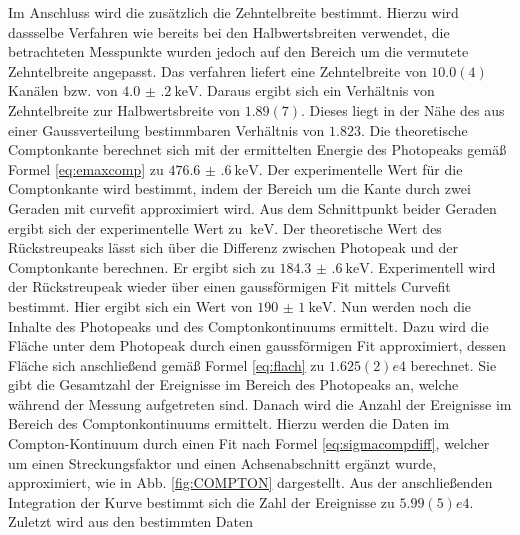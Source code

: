 Im Anschluss wird die zusätzlich die Zehntelbreite bestimmt. Hierzu wird dassselbe Verfahren wie bereits bei den Halbwertsbreiten verwendet, die betrachteten Messpunkte wurden jedoch auf den Bereich um die vermutete Zehntelbreite angepasst. Das verfahren liefert eine Zehntelbreite von $\si{10.0(4)}$ Kanälen bzw. von $\SI{4.0(2)}{\kilo\electronvolt}$. Daraus ergibt sich ein Verhältnis von Zehntelbreite zur Halbwertsbreite von $1.89(7)$. Dieses liegt in der Nähe des aus einer Gaussverteilung bestimmbaren Verhältnis von $\si{1.823}$\cite{V18}. Die theoretische Comptonkante berechnet sich mit der ermittelten Energie des Photopeaks gemäß Formel \eqref{eq:emaxcomp} zu $\SI{476.6(6)}{\kilo\electronvolt}$. Der experimentelle Wert für die Comptonkante wird bestimmt, indem der Bereich um die Kante durch zwei Geraden mit curvefit\cite{V18} approximiert wird. Aus dem Schnittpunkt beider Geraden ergibt sich der experimentelle Wert zu $\SI{}{\kilo\electronvolt}$. Der theoretische Wert des Rückstreupeaks lässt sich über die Differenz zwischen Photopeak und der Comptonkante berechnen. Er ergibt sich zu $\SI{184.3(6)}{\kilo\electronvolt}$. Experimentell wird der Rückstreupeak wieder über einen gaussförmigen Fit mittels Curvefit bestimmt. Hier ergibt sich ein Wert von $\SI{190(1)}{\kilo\electronvolt}$. Nun werden noch die Inhalte des Photopeaks und des Comptonkontinuums ermittelt. Dazu wird die Fläche unter dem Photopeak durch einen gaussförmigen Fit approximiert, dessen Fläche sich anschließend gemäß Formel \eqref{eq:flach} zu $\si{1.625(2)e4}$ berechnet. Sie gibt die Gesamtzahl der Ereignisse im Bereich des Photopeaks an, welche während der Messung aufgetreten sind. Danach wird die Anzahl der Ereignisse im Bereich des Comptonkontinuums ermittelt. Hierzu werden die Daten im Compton-Kontinuum durch einen Fit nach Formel \eqref{eq:sigmacompdiff}, welcher um einen Streckungsfaktor und einen Achsenabschnitt ergänzt wurde, approximiert, wie in Abb. \ref{fig:COMPTON} dargestellt. Aus der anschließenden Integration der Kurve bestimmt sich die Zahl der Ereignisse zu $\si{5.99(5)e4}$. Zuletzt wird aus den bestimmten Daten 







